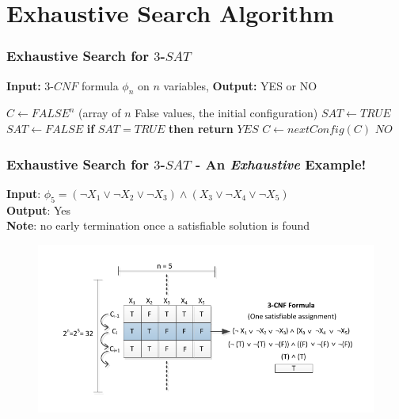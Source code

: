 \documentclass[handout,10pt]{beamer}
\begin{document}

\section{Exhaustive Search Algorithm}
\begin{frame}[fragile]
	\frametitle{Exhaustive Search for $3$-$SAT$}
\textbf{Input:} $3$-$CNF$ formula $\phi_n$ on $n$ variables, \textbf{Output:} YES or NO 

\medskip

\begin{algorithm}[H]
\begin{algorithmic}[1]
\STATE $C \gets FALSE^n$ (array of $n$ False values, the initial configuration)
	\STATE $SAT \gets TRUE$
			\STATE $SAT \gets FALSE$
		\ENDIF
	\ENDFOR	
	\STATE \textbf{if} $SAT = TRUE$ \textbf{then return} $YES$
	\STATE $C \gets nextConfig(C)$
\ENDFOR
\RETURN $NO$
\end{algorithmic}
\label{alg:seq}
\end{algorithm}
	
\end{frame}

\begin{frame}
	\frametitle{Exhaustive Search for $3$-$SAT$ - An \emph{Exhaustive} Example!}
\textbf{Input}: $\phi_5 = (\lnot X_1 \lor \lnot X_2 \lor \lnot X_3) \land (X_3 \lor \lnot X_4 \lor \lnot X_5)$ \\
\textbf{Output}: Yes \\ 
\textbf{Note}: no early termination once a satisfiable solution is found
\begin{figure}
\centering
\includegraphics[scale = 0.8]{satSolverAlg.pdf}
\end{figure}
\end{frame}
\end{document}
